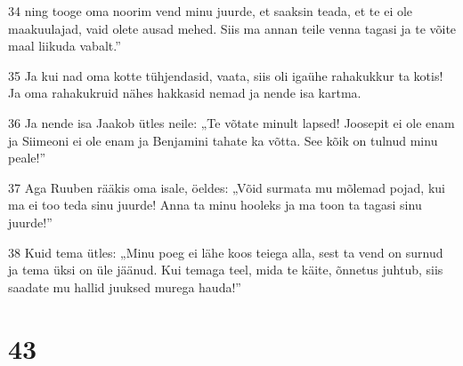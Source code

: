\par 34 ning tooge oma noorim vend minu juurde, et saaksin teada, et te ei ole maakuulajad, vaid olete ausad mehed. Siis ma annan teile venna tagasi ja te võite maal liikuda vabalt.”
\par 35 Ja kui nad oma kotte tühjendasid, vaata, siis oli igaühe rahakukkur ta kotis! Ja oma rahakukruid nähes hakkasid nemad ja nende isa kartma.
\par 36 Ja nende isa Jaakob ütles neile: „Te võtate minult lapsed! Joosepit ei ole enam ja Siimeoni ei ole enam ja Benjamini tahate ka võtta. See kõik on tulnud minu peale!”
\par 37 Aga Ruuben rääkis oma isale, öeldes: „Võid surmata mu mõlemad pojad, kui ma ei too teda sinu juurde! Anna ta minu hooleks ja ma toon ta tagasi sinu juurde!”
\par 38 Kuid tema ütles: „Minu poeg ei lähe koos teiega alla, sest ta vend on surnud ja tema üksi on üle jäänud. Kui temaga teel, mida te käite, õnnetus juhtub, siis saadate mu hallid juuksed murega hauda!”

\chapter{43}

